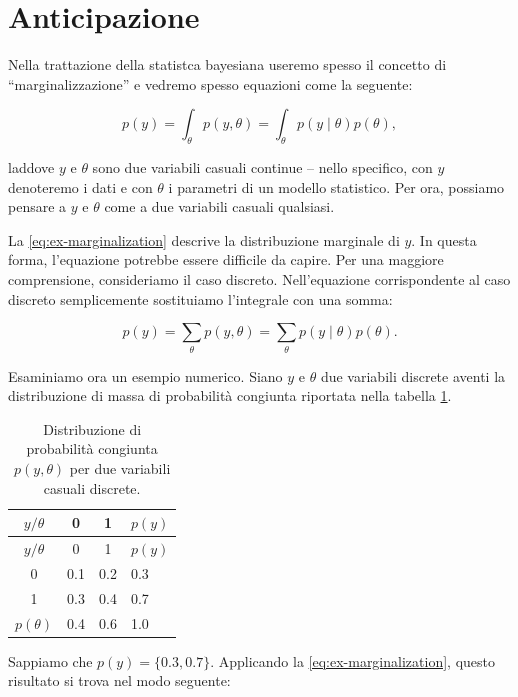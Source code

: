 \documentclass[
  11pt,
]{krantz}
\theoremstyle{definition}
\theoremstyle{definition}
\theoremstyle{definition}
\theoremstyle{definition}
\theoremstyle{remark}
\begin{document}
\hypertarget{anticipazione}{%
\section{Anticipazione}\label{anticipazione}}

Nella trattazione della statistca bayesiana useremo spesso il concetto di ``marginalizzazione'' e vedremo spesso equazioni come la seguente:

\begin{equation}
p(y) = \int_{\theta} p(y, \theta) = \int_{\theta} p(y \mid \theta) p(\theta),
\end{equation}

laddove \(y\) e \(\theta\) sono due variabili casuali continue -- nello specifico, con \(y\) denoteremo i dati e con \(\theta\) i parametri di un modello statistico. Per ora, possiamo pensare a \(y\) e \(\theta\) come a due variabili casuali qualsiasi.

La \eqref{eq:ex-marginalization} descrive la distribuzione marginale di \(y\). In questa forma, l'equazione potrebbe essere difficile da capire. Per una maggiore comprensione, consideriamo il caso discreto. Nell'equazione corrispondente al caso discreto semplicemente sostituiamo l'integrale con una somma:

\begin{equation}
p(y) = \sum_{\theta} p(y, \theta) = \sum_{\theta} p(y \mid \theta) p(\theta).
\label{eq:ex-marginalization}
\end{equation}

Esaminiamo ora un esempio numerico. Siano \(y\) e \(\theta\) due variabili discrete aventi la distribuzione di massa di probabilità congiunta riportata nella tabella \ref{tab:ex-marg}.

\begin{longtable}[]{@{}cccl@{}}
\caption{\label{tab:ex-marg} Distribuzione di probabilità congiunta \(p(y, \theta)\) per due variabili casuali discrete.}\tabularnewline
\toprule
\(y / \theta\) & 0 & 1 & \(p(y)\) \\
\midrule
\endfirsthead
\toprule
\(y / \theta\) & 0 & 1 & \(p(y)\) \\
\midrule
\endhead
0 & 0.1 & 0.2 & 0.3 \\
1 & 0.3 & 0.4 & 0.7 \\
\(p(\theta)\) & 0.4 & 0.6 & 1.0 \\
\bottomrule
\end{longtable}

Sappiamo che \(p(y) = \{0.3, 0.7\}\). Applicando la \eqref{eq:ex-marginalization}, questo risultato si trova nel modo seguente:
\end{document}
